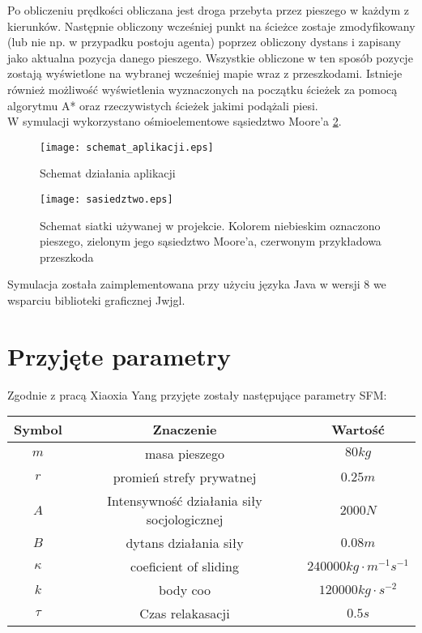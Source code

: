 Po obliczeniu prędkości obliczana jest droga przebyta przez pieszego w każdym z kierunków. Następnie obliczony wcześniej punkt na ścieżce zostaje zmodyfikowany (lub nie np. w przypadku postoju agenta) poprzez obliczony dystans i zapisany jako aktualna pozycja danego pieszego. Wszystkie obliczone w ten sposób pozycje zostają wyświetlone na wybranej wcześniej mapie wraz z przeszkodami. Istnieje również możliwość wyświetlenia wyznaczonych na początku ścieżek za pomocą algorytmu A* oraz rzeczywistych ścieżek jakimi podążali piesi.\\
W symulacji wykorzystano ośmioelementowe sąsiedztwo Moore'a \ref{figure:siatka}. 

\begin{figure}
\label{figure:siatka}
\centering
\texttt{[image: schemat\_aplikacji.eps]}
\caption{Schemat działania aplikacji}
\end{figure}

\begin{figure}
\label{figure:siatka}
\centering
\texttt{[image: sasiedztwo.eps]}
\caption{Schemat siatki używanej w projekcie. Kolorem niebieskim oznaczono pieszego, zielonym jego sąsiedztwo Moore'a, czerwonym przykładowa przeszkoda}
\end{figure}

Symulacja została zaimplementowana przy użyciu języka Java w wersji 8 we wsparciu biblioteki graficznej Jwjgl.

\section{Przyjęte parametry}

Zgodnie z pracą Xiaoxia Yang \cite{GuideCrowdDynViaModifiedSocialForceModel} przyjęte zostały następujące parametry SFM:\\

\begin{center}
\begin{tabular}{c||c|c}
Symbol & Znaczenie & Wartość\\
\hline
$m$ & masa pieszego & $80kg$ \\ 
$r$ & promień strefy prywatnej & $0.25m$ \\
$A$ & Intensywność działania siły socjologicznej & $2000 N$ \\
$B$ & dytans działania siły & $0.08 m$ \\
$\kappa$ & coeficient of sliding & $240000 kg \cdot m^{-1}s^{-1}$ \\
$k$ & body coo & $120000 kg \cdot s^{-2}$ \\
$\tau$ & Czas relakasacji & $0.5 s$ \\
\end{tabular} 
\end{center}
